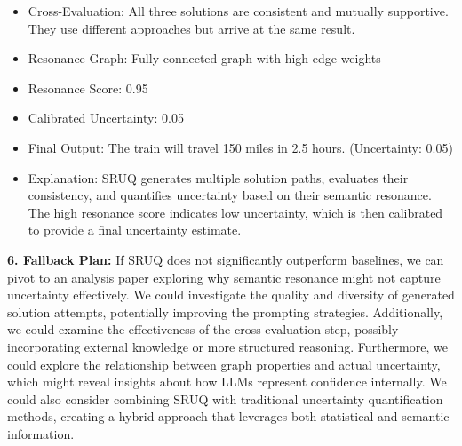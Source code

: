 \begin{tcolorbox}[colback=blue!5!white,colframe=blue!75!black,title=\textbf{Semantic Resonance Uncertainty Quantification (SRUQ) (Part 3)}]
\begin{itemize}
\begin{itemize}
\begin{enumerate}
\begin{itemize}
                        \item 1 hour: 60 miles
                        \item 0.5 hour: 30 miles
                        \item Sum: 60 + 60 + 30 = 150 miles
                    \end{itemize}
            \end{enumerate}
            \item Cross-Evaluation: All three solutions are consistent and mutually supportive. They use different approaches but arrive at the same result.
            \item Resonance Graph: Fully connected graph with high edge weights
            \item Resonance Score: 0.95
            \item Calibrated Uncertainty: 0.05
            \item Final Output: The train will travel 150 miles in 2.5 hours. (Uncertainty: 0.05)
            \item Explanation: SRUQ generates multiple solution paths, evaluates their consistency, and quantifies uncertainty based on their semantic resonance. The high resonance score indicates low uncertainty, which is then calibrated to provide a final uncertainty estimate.
        \end{itemize}
    \end{itemize}

    \textbf{6. Fallback Plan:} If SRUQ does not significantly outperform baselines, we can pivot to an analysis paper exploring why semantic resonance might not capture uncertainty effectively. We could investigate the quality and diversity of generated solution attempts, potentially improving the prompting strategies. Additionally, we could examine the effectiveness of the cross-evaluation step, possibly incorporating external knowledge or more structured reasoning. Furthermore, we could explore the relationship between graph properties and actual uncertainty, which might reveal insights about how LLMs represent confidence internally. We could also consider combining SRUQ with traditional uncertainty quantification methods, creating a hybrid approach that leverages both statistical and semantic information.

\end{tcolorbox}


\newpage 

